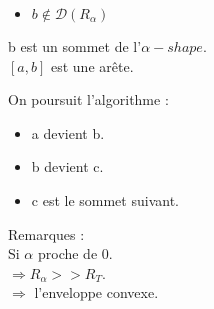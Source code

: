 \begin{frame}
\begin{columns}[t]
\begin{column}{3cm}
\begin{block}{}
{        }
        {
          \begin{itemize}
            \item $b \notin \mathcal{D} \left( R_{\alpha} \right)$
          \end{itemize}
        }
        {
          b est un sommet de l'$\alpha-shape$.\\
          $[a, b]$ est une arête.
        }
        {
          On poursuit l'algorithme :\\
          \begin{itemize}
            \item a devient b.
            \item b devient c.
            \item c est le sommet suivant.
          \end{itemize}
        }
        { Remarques :\\
          \alert{Si $\alpha$ proche de 0.}\\
          \alert{$\Rightarrow R_{\alpha} >> R_T$.}\\
          \alert{$\Rightarrow$ l'enveloppe convexe.}\\
        }
			\end{block}

    \end{column}
  \end{columns}

\end{frame}


